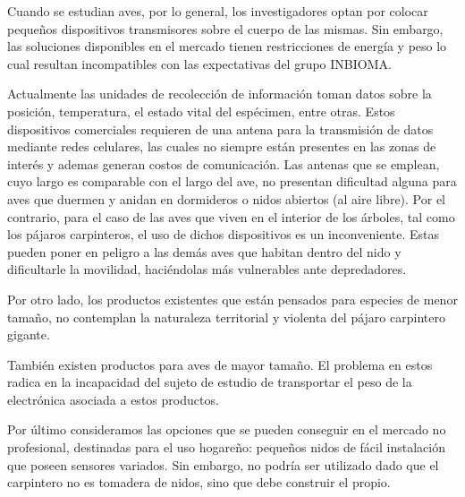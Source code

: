 %

%


Cuando se estudian aves, por lo general, los investigadores optan por colocar pequeños dispositivos transmisores sobre el cuerpo de las mismas. Sin embargo, las soluciones disponibles en el mercado tienen restricciones de energía y peso lo cual resultan incompatibles con las expectativas del grupo INBIOMA.

Actualmente las unidades de recolección de información toman datos sobre la posición, temperatura, el estado vital del espécimen, entre otras. Estos dispositivos comerciales requieren de una antena para la transmisión de datos mediante redes celulares, las cuales no siempre están presentes en las zonas de interés y ademas generan costos de comunicación. Las antenas que se emplean, cuyo largo es comparable con el largo del ave, no presentan dificultad alguna para aves que duermen y anidan en dormideros o nidos abiertos (al aire libre). Por el contrario, para el caso de las aves que viven en el interior de los árboles, tal como los pájaros carpinteros, el uso de dichos dispositivos es un inconveniente. Estas pueden poner en peligro a las demás aves que habitan dentro del nido y dificultarle la movilidad, haciéndolas más vulnerables ante depredadores.

Por otro lado, los productos existentes que están pensados para especies de menor tamaño, no contemplan la naturaleza territorial y violenta del pájaro carpintero gigante.

También existen productos para aves de mayor tamaño. El problema en estos radica en la incapacidad del sujeto de estudio de transportar el peso de la electrónica asociada a estos productos.

Por último consideramos las opciones que se pueden conseguir en el mercado no profesional, destinadas para el uso hogareño: pequeños nidos de fácil instalación que poseen sensores variados. Sin embargo, no podría ser utilizado dado que el carpintero no es tomadera de nidos, sino que debe construir el propio. 

